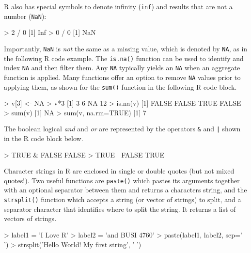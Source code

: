 R also has special symbols to denote infinity (\texttt{inf}) and results that are not a number (\texttt{NaN}):

\begin{samepage}
\begin{Rcode}
> 2 / 0
[1] Inf
> 0 / 0
[1] NaN
\end{Rcode}
\end{samepage}

Importantly, \texttt{NaN} is \emph{not} the same as a missing value, which is denoted by \texttt{NA}, as in the following R code example. The \texttt{is.na()} function can be used to identify and index \texttt{NA} and then filter them. Any \texttt{NA} typically yields an \texttt{NA} when an aggregate function is applied. Many functions offer an option to remove \texttt{NA} values prior to applying them, as shown for the \texttt{sum()} function in the following R code block. 

\begin{samepage}
\begin{Rcode}
> v[3] <- NA
> v*3
[1]  3  6 NA 12
> is.na(v)
[1] FALSE FALSE  TRUE FALSE
> sum(v)
[1] NA
> sum(v, na.rm=TRUE)
[1] 7
\end{Rcode}
\end{samepage}

\noindent The boolean logical \emph{and} and \emph{or} are represented by the operators \texttt{\&} and \texttt{|} shown in the R code block below.

\begin{samepage}
\begin{Rcode}
> TRUE & FALSE
FALSE
> TRUE | FALSE
TRUE
\end{Rcode}
\end{samepage}

Character strings in R are enclosed in single or double quotes (but not mixed quotes!). Two useful functions are \texttt{paste()} which pastes its arguments together with an optional separator between them and returns a characters string, and the \texttt{strsplit()} function which accepts a string (or vector of strings) to split, and a separator character that identifies where to split the string. It returns a list of vectors of strings.

\begin{samepage}
\begin{Rcode}
> label1 = 'I Love R'
> label2 = 'and BUSI 4760'
> paste(label1, label2, sep=' ')
> strsplit('Hello World! My first string', ' ')
\end{Rcode}
\end{samepage}

